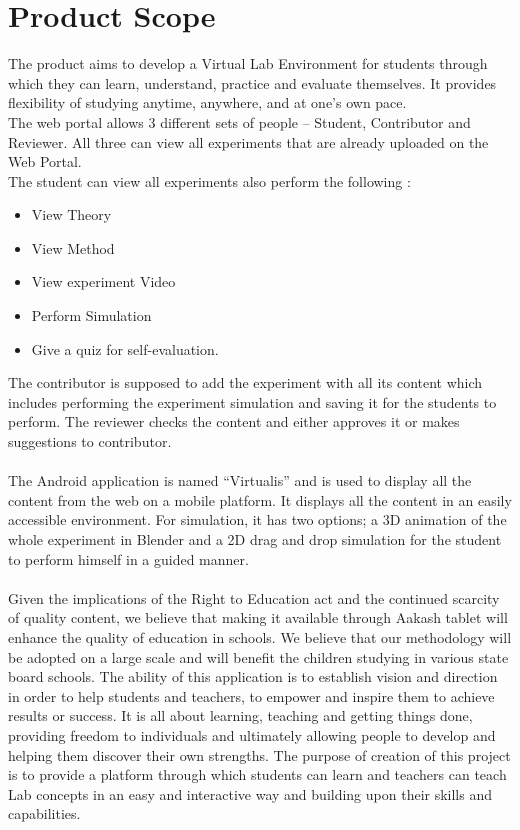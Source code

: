 \documentclass[12pt]{report}
\begin{document}
\section{Product Scope}
The product aims to develop a Virtual Lab Environment for students through which they can learn, understand, practice and evaluate themselves. It provides flexibility of studying anytime, anywhere, and at one's own pace.
\\

The web portal allows 3 different sets of people – Student, Contributor and Reviewer. All three can view all experiments that are already uploaded on the Web Portal. \\
The student can view all experiments also perform the following :
\begin{itemize}
\item View Theory
\item View Method
\item View experiment Video
\item Perform Simulation
\item Give a quiz for self-evaluation.
\end{itemize}

The contributor is supposed to add the experiment with all its content which includes performing the experiment simulation and saving it for the students to perform. The reviewer checks the content and either approves it or makes suggestions to contributor.
\\
\\
The Android application is named ``Virtualis” and is used to display all the content from the web on a mobile platform. It displays all the content in an easily accessible environment. For simulation, it has two options; a 3D animation of the whole experiment in Blender and a 2D drag and drop simulation for the student to perform himself in a guided manner.
\\
\\
Given the implications of the Right to Education act and the continued scarcity of quality content, we believe that making it available through Aakash tablet will enhance the quality of education in schools. We believe that our methodology will be adopted on a large scale and will benefit the children studying in various state board schools. The ability of this application is to establish vision and direction in order to help students and teachers, to empower and inspire them to achieve results or success. It is all about learning, teaching and getting things done, providing freedom to individuals and ultimately allowing people to develop and helping them discover their own strengths. The purpose of creation of this project is to provide a platform through which students can learn and teachers can teach Lab concepts in an easy and interactive way and building upon their skills and capabilities.
\end{document}
